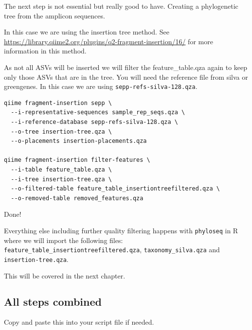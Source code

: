 \documentclass[
]{book}
\begin{document}
The next step is not essential but really good to have. Creating a phylogenetic tree from the amplicon sequences.

In this case we are using the insertion tree method. See \url{https://library.qiime2.org/plugins/q2-fragment-insertion/16/} for more information in this method.

As not all ASVs will be inserted we will filter the feature\_table.qza again to keep only those ASVs that are in the tree. You will need the reference file from silva or greengenes. In this case we are using \texttt{sepp-refs-silva-128.qza}.

\begin{verbatim}
qiime fragment-insertion sepp \
  --i-representative-sequences sample_rep_seqs.qza \
  --i-reference-database sepp-refs-silva-128.qza \
  --o-tree insertion-tree.qza \
  --o-placements insertion-placements.qza

qiime fragment-insertion filter-features \
  --i-table feature_table.qza \
  --i-tree insertion-tree.qza \
  --o-filtered-table feature_table_insertiontreefiltered.qza \
  --o-removed-table removed_features.qza
\end{verbatim}

Done!

Everything else including further quality filtering happens with \texttt{phyloseq} in R where we will import the following files:
\texttt{feature\_table\_insertiontreefiltered.qza},
\texttt{taxonomy\_silva.qza} and
\texttt{insertion-tree.qza}.

This will be covered in the next chapter.

\hypertarget{all-steps-combined}{%
\subsection{All steps combined}\label{all-steps-combined}}

Copy and paste this into your script file if needed.
\end{document}
